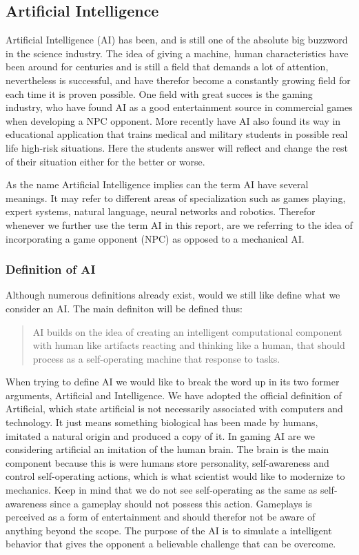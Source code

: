 \subsection{Artificial Intelligence} \label{sec:ai}
Artificial Intelligence (AI) has been, and is still one of the absolute big buzzword in the science industry.
The idea of giving a machine, human characteristics have been around for centuries and is still a field that demands a lot of attention, nevertheless is successful, and have therefor become a constantly growing field for each time it is proven possible.
One field with great succes is the gaming industry, who have found AI as a good entertainment source in commercial games when developing a NPC opponent. More recently have AI also found its way in educational application that trains medical and military students in possible real life high-risk situations. Here the students answer will reflect and change the rest of their situation either for the better or worse.

As the name Artificial Intelligence implies can the term AI have several meanings. It may refer to different areas of specialization such as games playing, expert systems, natural language, neural networks and robotics.
Therefor whenever we further use the term AI in this report, are we referring to the idea of incorporating a game opponent (NPC) as opposed to a mechanical AI.



\subsubsection{Definition of AI}

Although numerous definitions already exist, would we still like define what we consider an AI. The main definiton will be defined thus:

		\begin{quote}
		AI builds on the idea of creating an intelligent computational component with human like artifacts 			reacting and thinking like a human, that should process as a self-operating machine that response to 		tasks.
		\end{quote}

When trying to define AI we would like to break the word up in its two former arguments, Artificial and Intelligence.
We have adopted the official definition of Artificial, which state artificial is not necessarily associated with computers and technology. It just means something biological has been made by humans, imitated a natural origin and produced a copy of it.
In gaming AI are we considering artificial an imitation of the human brain. The brain is the main component because this is were humans store personality, self-awareness and control self-operating actions, which is what scientist would like to modernize to mechanics.
Keep in mind that we do not see self-operating as the same as self-awareness since a gameplay should not possess this action. Gameplays is perceived as a form of entertainment and should therefor not be aware of anything beyond the scope. The purpose of the AI is to simulate a intelligent behavior that gives the opponent a believable challenge that can be overcome.

